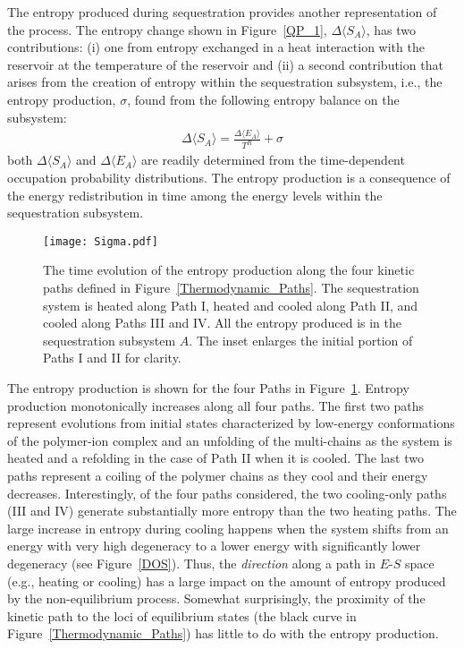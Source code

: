\documentclass[
journal=jcisd8, %
manuscript=article,
layout=twocolumn   %
]{achemso}
\begin{document}
The entropy produced during sequestration provides another representation of the process. The entropy change shown in Figure~\ref{QP_1}, $\Delta \langle S_{A} \rangle$, has two contributions: (i) one from entropy exchanged in a heat interaction with the reservoir at the temperature of the reservoir and (ii) a second contribution that arises from the creation of entropy within the sequestration subsystem, i.e., the entropy production, $\sigma$, found from the following entropy balance on the subsystem: 
\begin{align}
\Delta \langle S_{A} \rangle = \frac{\Delta \langle E_{A} \rangle}{T^{R}} + \sigma
\label{EntropyProduction}
\end{align}
both $\Delta \langle S_{A} \rangle$ and $\Delta \langle E_{A} \rangle$ are readily determined from the time-dependent occupation probability distributions. The entropy production is a consequence of the energy redistribution in time among the energy levels within the sequestration subsystem.
\begin{figure}
	\centering
	\texttt{[image: Sigma.pdf]}
	\caption{The time evolution of the entropy production along the four kinetic paths defined in Figure~\ref{Thermodynamic_Paths}. The sequestration system is heated along Path I, heated and cooled along Path II, and cooled along Paths III and IV. All the entropy produced is in the sequestration subsystem $A$. The inset enlarges the initial portion of Paths I and II for clarity.}
	\label{SP_1}
\end{figure}

The entropy production is shown for the four Paths in Figure~\ref{SP_1}.  Entropy production monotonically increases along all four paths.  The first two paths represent evolutions from initial states characterized by low-energy conformations of the polymer-ion complex and an unfolding of the multi-chains as the system is heated and a refolding in the case of Path II when it is cooled. The last two paths represent a coiling of the polymer chains as they cool and their energy decreases. Interestingly, of the four paths considered, the two cooling-only paths (III and IV) generate substantially more entropy than the two heating paths. The large increase in entropy during cooling happens when the system shifts from an energy with very high degeneracy to a lower energy with significantly lower degeneracy (see Figure~\ref{DOS}). Thus, the {\em direction} along a path in $E$-$S$ space (e.g., heating or cooling) has a large impact on the amount of entropy produced by the non-equilibrium process. Somewhat surprisingly, the proximity of the kinetic path to the loci of equilibrium states (the black curve in Figure~\ref{Thermodynamic_Paths}) has little to do with the entropy production.
\end{document}
